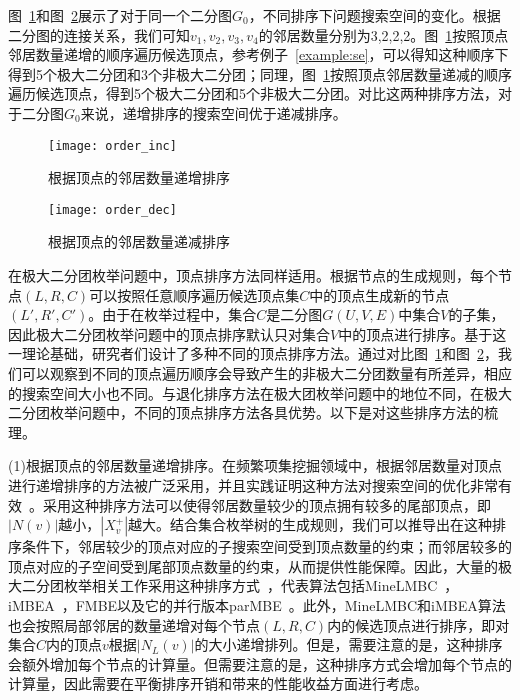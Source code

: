 \begin{example}
  图~\ref{fig:order_inc}和图~\ref{fig:order_dec}展示了对于同一个二分图$G_0$，不同排序下问题搜索空间的变化。根据二分图的连接关系，我们可知$v_1,v_2,v_3,v_4$的邻居数量分别为3,2,2,2。图~\ref{fig:order_inc}按照顶点邻居数量递增的顺序遍历候选顶点，参考例子~\ref{example:se}，可以得知这种顺序下得到5个极大二分团和3个非极大二分团；同理，图~\ref{fig:order_inc}按照顶点邻居数量递减的顺序遍历候选顶点，得到5个极大二分团和5个非极大二分团。对比这两种排序方法，对于二分图$G_0$来说，递增排序的搜索空间优于递减排序。
\end{example}


\begin{figure} 
  \center
    \vspace{0.1in}
		\texttt{[image: order\_inc]}
    \vspace{0.1in}
	\caption{根据顶点的邻居数量递增排序}
	\label{fig:order_inc}
\end{figure}


\begin{figure}
  \center
  \vspace{0.1in}
    \texttt{[image: order\_dec]}
    \vspace{0.1in}
  \caption{根据顶点的邻居数量递减排序}
	\label{fig:order_dec}
\end{figure}

在极大二分团枚举问题中，顶点排序方法同样适用。根据节点的生成规则，每个节点$(L,R,C)$可以按照任意顺序遍历候选顶点集$C$中的顶点生成新的节点$(L',R',C')$。由于在枚举过程中，集合$C$是二分图$G(U,V,E)$中集合$V$的子集，因此极大二分团枚举问题中的顶点排序默认只对集合$V$中的顶点进行排序。基于这一理论基础，研究者们设计了多种不同的顶点排序方法。通过对比图~\ref{fig:order_inc}和图~\ref{fig:order_dec}，我们可以观察到不同的顶点遍历顺序会导致产生的非极大二分团数量有所差异，相应的搜索空间大小也不同。与退化排序方法在极大团枚举问题中的地位不同，在极大二分团枚举问题中，不同的顶点排序方法各具优势。以下是对这些排序方法的梳理。

(1)根据顶点的邻居数量递增排序。在频繁项集挖掘领域中，根据邻居数量对顶点进行递增排序的方法被广泛采用，并且实践证明这种方法对搜索空间的优化非常有效~\cite{lcm04}。采用这种排序方法可以使得邻居数量较少的顶点拥有较多的尾部顶点，即$|N(v)|$越小，$|X_v^+|$越大。结合集合枚举树的生成规则，我们可以推导出在这种排序条件下，邻居较少的顶点对应的子搜索空间受到顶点数量的约束；而邻居较多的顶点对应的子空间受到尾部顶点数量的约束，从而提供性能保障。因此，大量的极大二分团枚举相关工作采用这种排序方式~\cite{lcmmbc07,minel06,iMBEA14,mapreduceMBE16,parMBE18,MEB20}，代表算法包括MineLMBC~\cite{minel06}，iMBEA~\cite{iMBEA14}，FMBE以及它的并行版本parMBE~\cite{parMBE18}。此外，MineLMBC和iMBEA算法也会按照局部邻居的数量递增对每个节点$(L,R,C)$内的候选顶点进行排序，即对集合$C$内的顶点$v$根据$|N_L(v)|$的大小递增排列。但是，需要注意的是，这种排序会额外增加每个节点的计算量。但需要注意的是，这种排序方式会增加每个节点的计算量，因此需要在平衡排序开销和带来的性能收益方面进行考虑。

